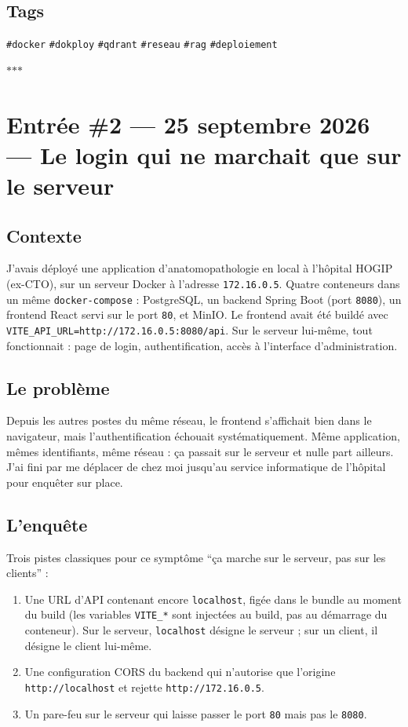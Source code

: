 \documentclass[10pt,twoside,openany]{article}
\newcommand{\entryrule}{\par\vspace{1.2em}\begin{center}\color{accentblue}$\ast$\quad$\ast$\quad$\ast$\end{center}\par}
\newcommand{\tag}[1]{\texttt{\footnotesize\color{tagolive}\#{#1}}}
\begin{document}
\subsection*{Tags}
\tag{docker} \quad \tag{dokploy} \quad \tag{qdrant} \quad \tag{reseau} \quad \tag{rag} \quad \tag{deploiement}

\entryrule

\section{Entrée \#2 --- 25 septembre 2026 --- Le login qui ne marchait que sur le serveur}

\subsection*{Contexte}
J'avais déployé une application d'anatomopathologie en local à l'hôpital HOGIP (ex-CTO), sur un serveur Docker à l'adresse \texttt{172.16.0.5}. Quatre conteneurs dans un même \texttt{docker-compose} : PostgreSQL, un backend Spring Boot (port \texttt{8080}), un frontend React servi sur le port \texttt{80}, et MinIO. Le frontend avait été buildé avec \texttt{VITE\_API\_URL=http://172.16.0.5:8080/api}. Sur le serveur lui-même, tout fonctionnait : page de login, authentification, accès à l'interface d'administration.

\subsection*{Le problème}
Depuis les autres postes du même réseau, le frontend s'affichait bien dans le navigateur, mais l'authentification échouait systématiquement. Même application, mêmes identifiants, même réseau : ça passait sur le serveur et nulle part ailleurs. J'ai fini par me déplacer de chez moi jusqu'au service informatique de l'hôpital pour enquêter sur place.

\subsection*{L'enquête}
Trois pistes classiques pour ce symptôme \enquote{ça marche sur le serveur, pas sur les clients} :
\begin{enumerate}
  \item Une URL d'API contenant encore \texttt{localhost}, figée dans le bundle au moment du build (les variables \texttt{VITE\_*} sont injectées au build, pas au démarrage du conteneur). Sur le serveur, \texttt{localhost} désigne le serveur ; sur un client, il désigne le client lui-même.
  \item Une configuration CORS du backend qui n'autorise que l'origine \texttt{http://localhost} et rejette \texttt{http://172.16.0.5}.
  \item Un pare-feu sur le serveur qui laisse passer le port \texttt{80} mais pas le \texttt{8080}.
\end{enumerate}
\end{document}
